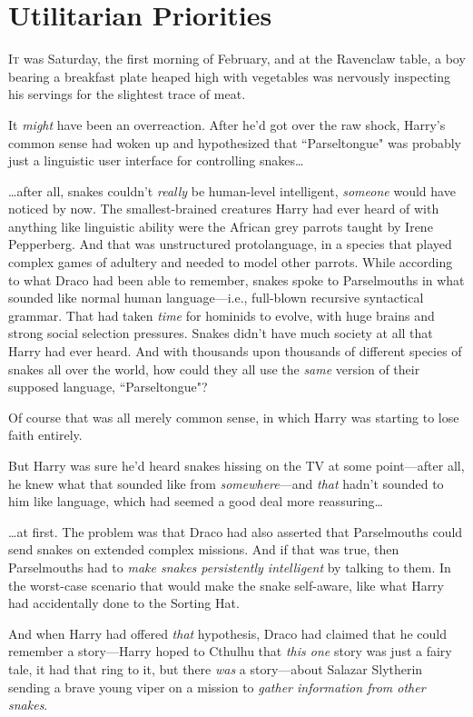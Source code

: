 \chapter{Utilitarian Priorities}

\lettrine{I}{t} was Saturday, the first morning of February, and at the Ravenclaw table, a boy bearing a breakfast plate heaped high with vegetables was nervously inspecting his servings for the slightest trace of meat.

It \emph{might} have been an overreaction. After he'd got over the raw shock, Harry's common sense had woken up and hypothesized that ``Parseltongue" was probably just a linguistic user interface for controlling snakes{\ldots}

{\ldots}after all, snakes couldn't \emph{really} be human-level intelligent, \emph{someone} would have noticed by now. The smallest-brained creatures Harry had ever heard of with anything like linguistic ability were the African grey parrots taught by Irene Pepperberg. And that was unstructured protolanguage, in a species that played complex games of adultery and needed to model other parrots. While according to what Draco had been able to remember, snakes spoke to Parselmouths in what sounded like normal human language---i.e., full-blown recursive syntactical grammar. That had taken \emph{time} for hominids to evolve, with huge brains and strong social selection pressures. Snakes didn't have much society at all that Harry had ever heard. And with thousands upon thousands of different species of snakes all over the world, how could they all use the \emph{same} version of their supposed language, ``Parseltongue"?

Of course that was all merely common sense, in which Harry was starting to lose faith entirely.

But Harry was sure he'd heard snakes hissing on the TV at some point---after all, he knew what that sounded like from \emph{somewhere}---and \emph{that} hadn't sounded to him like language, which had seemed a good deal more reassuring{\ldots}

{\ldots}at first. The problem was that Draco had also asserted that Parselmouths could send snakes on extended complex missions. And if that was true, then Parselmouths had to \emph{make snakes persistently intelligent} by talking to them. In the worst-case scenario that would make the snake self-aware, like what Harry had accidentally done to the Sorting Hat.

And when Harry had offered \emph{that} hypothesis, Draco had claimed that he could remember a story---Harry hoped to Cthulhu that \emph{this one} story was just a fairy tale, it had that ring to it, but there \emph{was} a story---about Salazar Slytherin sending a brave young viper on a mission to \emph{gather information from other snakes}.

